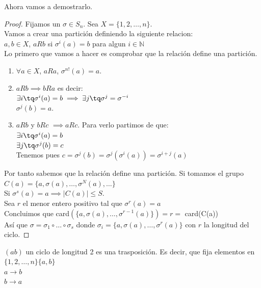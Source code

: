 \documentclass[nochap]{apuntes}
\begin{document}
Ahora vamos a demostrarlo.

\begin{proof}
Fijamos un $\sigma \in S_n$. Sea $X = \{ 1,2,\hdots ,n\} $.\\
Vamos a crear una partición definiendo la siguiente relacion:\\
$a,b \in X$, $aRb$ si $\sigma ^i(a) = b$ para algun $i\in \mathbb{N}$\\

Lo primero que vamos a hacer es comprobar que la relación define una partición.
\begin{enumerate}
\item $\forall a \in X$, $aRa$, $\sigma ^{n!} (a) = a$.
\item $aRb \implies bRa$ es decir:\\
 $\exists i \tq \sigma ^i (a) = b \implies \exists j \tq \sigma ^j = \sigma ^{-i}$\\
 $\sigma ^j (b) = a$.
\item $aRb$ y $bRc$ $\implies aRc$. Para verlo partimos de que:\\
 $\exists i \tq \sigma ^i (a) = b $\\
 $\exists j \tq \sigma ^j (b) = c $\\
 Tenemos pues $c=\sigma^j(b)=\sigma^j(\sigma ^i(a))=\sigma^{i+j}(a)$


\end{enumerate}

Por tanto sabemos que la relación define una partición.
Si tomamos el grupo $C(a) = \{ a, \sigma (a), \hdots , \sigma ^N(a), \hdots \} $\\
Si $\sigma ^s (a)=a \implies |C(a)| \leq S$.\\
Sea $r$ el menor entero positivo tal que $\sigma^r(a)=a$\\
Concluimos que card$(\{ a, \sigma (a), \hdots , \sigma ^{r-1}(a)\}) = r =$ card(C(a))\\
Así que $\sigma = \sigma _1 \circ \hdots \circ \sigma _s$
donde $\sigma _i = \{ a, \sigma (a), \hdots , \sigma ^r(a)\} $ con $r$ la longitud del ciclo.
\end{proof}

\begin{defn}[Trasposición]
$(ab)$ un ciclo de longitud 2 es una trasposición.
Es decir, que fija elementos en $\{ 1,2, \hdots , n\} \{ a, b\} $\\
$a\longrightarrow b$\\
$b\longrightarrow a$\\
\end{defn}
\end{document}
